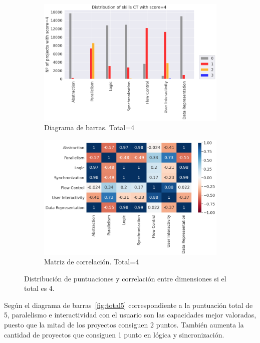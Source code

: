\documentclass[a4paper, 12pt]{book}
\begin{document}
\begin{figure}[H]
    \centering
    \begin{subfigure}[h]{.49\textwidth} 
        \includegraphics[width=\textwidth]{img/distribucion_4_Scratch}
        \caption{Diagrama de barras. Total=4}
        \label{fig:total4}
    \end{subfigure}       
    \begin{subfigure}[h]{.49\textwidth} 
        \includegraphics[width=\textwidth]{img/corr_4_Scratch}
        \caption{Matriz de correlación. Total=4}
        \label{fig:corr4}
    \end{subfigure}
     \caption{Distribución de puntuaciones y correlación entre dimensiones si el total es 4.}
\end{figure}

Según el diagrama de barras~\ref{fig:total5} correspondiente a la puntuación total de 5, paralelismo e interactividad con el usuario son las capacidades mejor valoradas, puesto que la mitad de los proyectos consiguen 2 puntos. También aumenta la cantidad de proyectos que consiguen 1 punto en lógica y sincronización.
\end{document}
